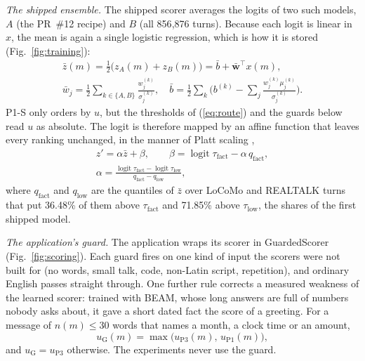 \emph{The shipped ensemble.} The shipped scorer averages the logits of two
such models, $A$ (the PR~\#12 recipe) and $B$ (all 856{,}876 turns). Because
each logit is linear in $x$, the mean is again a single logistic regression,
which is how it is stored (Fig.~\ref{fig:training}):
\begin{equation}
\label{eq:ens}
\begin{gathered}
\bar z(m)=\tfrac12\big(z_A(m)+z_B(m)\big)=\bar b+\bar{\mathbf{w}}^{\top}x(m),\\
\bar w_j=\tfrac12\sum_{k\in\{A,B\}}\frac{w^{(k)}_j}{\sigma^{(k)}_j},\quad
\bar b=\tfrac12\sum_{k}\Big(b^{(k)}-\sum_j\frac{w^{(k)}_j\mu^{(k)}_j}{\sigma^{(k)}_j}\Big).
\end{gathered}
\end{equation}
P1-S only orders by $u$, but the thresholds of (\ref{eq:route}) and the
guards below read $u$ as absolute. The logit is therefore mapped by an affine
function that leaves every ranking unchanged, in the manner of Platt scaling
\cite{platt1999probabilistic},
\begin{equation}
\label{eq:cal}
\begin{gathered}
z'=\alpha\bar z+\beta,\qquad
\beta=\operatorname{logit}\tau_{\text{fact}}-\alpha\,q_{\text{fact}},\\
\alpha=\frac{\operatorname{logit}\tau_{\text{fact}}-\operatorname{logit}\tau_{\text{low}}}{q_{\text{fact}}-q_{\text{low}}},
\end{gathered}
\end{equation}
where $q_{\text{fact}}$ and $q_{\text{low}}$ are the quantiles of $\bar z$
over LoCoMo and REALTALK turns that put 36.48\% of them above
$\tau_{\text{fact}}$ and 71.85\% above $\tau_{\text{low}}$, the shares of the
first shipped model.

\emph{The application's guard.} The application wraps its scorer in
GuardedScorer (Fig.~\ref{fig:scoring}). Each guard fires on one kind of input
the scorers were not built for (no words, small talk, code, non-Latin script,
repetition), and ordinary English passes straight through. One further rule
corrects a measured weakness of the learned scorer: trained with BEAM, whose
long answers are full of numbers nobody asks about, it gave a short dated
fact the score of a greeting. For a message of $n(m)\le30$ words that names a
month, a clock time or an amount,
\begin{equation}
\label{eq:floor}
u_{\mathrm{G}}(m)=\max\big(u_{\mathrm{P3}}(m),\,u_{\mathrm{P1}}(m)\big),
\end{equation}
and $u_{\mathrm{G}}=u_{\mathrm{P3}}$ otherwise. The experiments never use
the guard.


